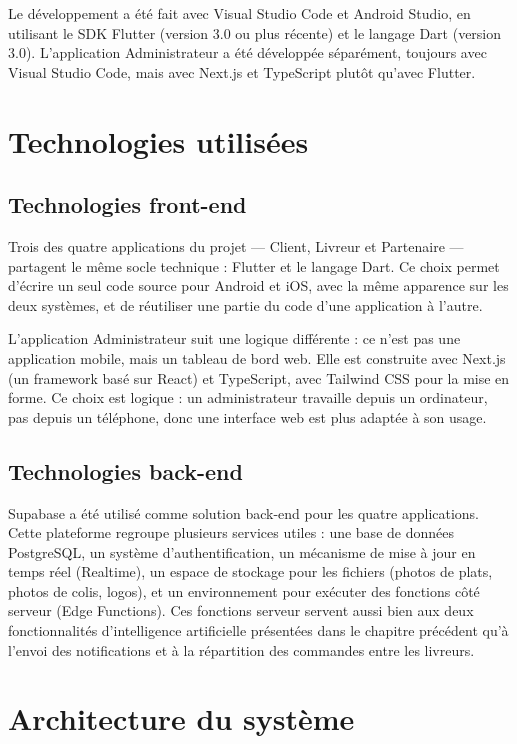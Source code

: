 \documentclass[12pt,fleqn,a4paper]{report}
\begin{document}
\begin{justify}
Le développement a été fait avec Visual Studio Code et Android Studio, en utilisant le SDK Flutter (version 3.0 ou plus récente) et le langage Dart (version 3.0). L'application Administrateur a été développée séparément, toujours avec Visual Studio Code, mais avec Next.js et TypeScript plutôt qu'avec Flutter.

\section{Technologies utilisées}

\subsection{Technologies front-end}

Trois des quatre applications du projet — Client, Livreur et Partenaire — partagent le même socle technique : Flutter et le langage Dart. Ce choix permet d'écrire un seul code source pour Android et iOS, avec la même apparence sur les deux systèmes, et de réutiliser une partie du code d'une application à l'autre.

L'application Administrateur suit une logique différente : ce n'est pas une application mobile, mais un tableau de bord web. Elle est construite avec Next.js (un framework basé sur React) et TypeScript, avec Tailwind CSS pour la mise en forme. Ce choix est logique : un administrateur travaille depuis un ordinateur, pas depuis un téléphone, donc une interface web est plus adaptée à son usage.

\subsection{Technologies back-end}

Supabase a été utilisé comme solution back-end pour les quatre applications. Cette plateforme regroupe plusieurs services utiles : une base de données PostgreSQL, un système d'authentification, un mécanisme de mise à jour en temps réel (Realtime), un espace de stockage pour les fichiers (photos de plats, photos de colis, logos), et un environnement pour exécuter des fonctions côté serveur (Edge Functions). Ces fonctions serveur servent aussi bien aux deux fonctionnalités d'intelligence artificielle présentées dans le chapitre précédent qu'à l'envoi des notifications et à la répartition des commandes entre les livreurs.

\section{Architecture du système}


\end{justify}
\end{document}
